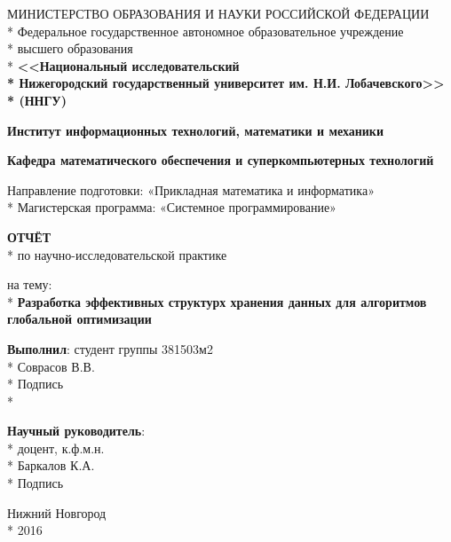 \begin{titlepage}

\begin{center}
МИНИСТЕРСТВО ОБРАЗОВАНИЯ И НАУКИ РОССИЙСКОЙ ФЕДЕРАЦИИ \\*
Федеральное   государственное  автономное  образовательное  учреждение \\*
высшего образования \\*
\textbf{<<Национальный исследовательский \\*
Нижегородский государственный университет им. Н.И. Лобачевского>> \\*
(ННГУ)}
\end{center}

\vspace{12pt}

\begin{center}
\textbf{Институт информационных технологий, математики и механики}
\end{center}

\begin{center}
\textbf{Кафедра математического обеспечения и суперкомпьютерных технологий}
\end{center}

\vspace{25pt}
\begin{center}
Направление подготовки: «Прикладная математика и информатика» \\*
Магистерская программа: «Системное программирование»
\end{center}
\vspace{30pt}

\begin{center}
\fontsize{18pt}{0pt}\textbf{ОТЧЁТ} \\*
по научно-исследовательской практике
\end{center}
\begin{center}
на тему: \\*
\fontsize{16pt}{0pt}\textbf{Разработка эффективных структурх хранения данных для алгоритмов глобальной оптимизации}
\end{center}

\vspace{53pt}

\begin{flushright}
\textbf{Выполнил}: студент группы 381503м2 \\*
 Соврасов В.В. \\*
Подпись  \\*

\textbf{Научный руководитель}:  \\*
доцент, к.ф.м.н.  \\*
 Баркалов К.А. \\*
Подпись 
\end{flushright}

\vspace{\fill}

\begin{center}
Нижний Новгород \\*
2016
\end{center}

\end{titlepage}
